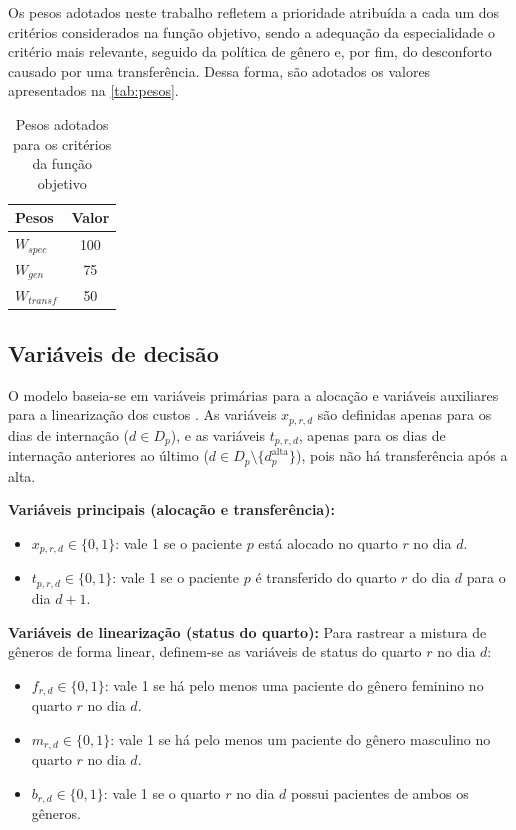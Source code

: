Os pesos adotados neste trabalho refletem a prioridade atribuída a cada um dos critérios considerados na função objetivo, sendo a adequação da especialidade o critério mais relevante, seguido da política de gênero e, por fim, do desconforto causado por uma transferência. Dessa forma, são adotados os valores apresentados na \autoref{tab:pesos}.

\begin{table}[H]
    \caption{Pesos adotados para os critérios da função objetivo}
    \label{tab:pesos}
    \centering
    \begin{tabular}{lc}
        \hline
        \textbf{Pesos} & \textbf{Valor} \\
        \hline
        $W_{spec}$ & 100 \\
        $W_{gen}$ & 75 \\
        $W_{transf}$ & 50 \\
        \hline
    \end{tabular}
\end{table}

\subsection{Variáveis de decisão}
O modelo baseia-se em variáveis primárias para a alocação e variáveis auxiliares para a linearização dos custos \cite{ceschia2011local}. As variáveis $x_{p,r,d}$ são definidas apenas para os dias de internação ($d \in D_p$), e as variáveis $t_{p,r,d}$, apenas para os dias de internação anteriores ao último ($d \in D_p \setminus \{d^{\text{alta}}_p\}$), pois não há transferência após a alta.

\textbf{Variáveis principais (alocação e transferência):}
\begin{itemize}
    \item $x_{p,r,d} \in \{0,1\}$: vale 1 se o paciente $p$ está alocado no quarto $r$ no dia $d$.
    \item $t_{p,r,d} \in \{0,1\}$: vale 1 se o paciente $p$ é transferido do quarto $r$ do dia $d$ para o dia $d+1$.
\end{itemize}

\textbf{Variáveis de linearização (status do quarto):}
Para rastrear a mistura de gêneros de forma linear, definem-se as variáveis de status do quarto $r$ no dia $d$:
\begin{itemize}
    \item $f_{r,d} \in \{0,1\}$: vale 1 se há pelo menos uma paciente do gênero feminino no quarto $r$ no dia $d$.
    \item $m_{r,d} \in \{0,1\}$: vale 1 se há pelo menos um paciente do gênero masculino no quarto $r$ no dia $d$.
    \item $b_{r,d} \in \{0,1\}$: vale 1 se o quarto $r$ no dia $d$ possui pacientes de ambos os gêneros.
\end{itemize}

